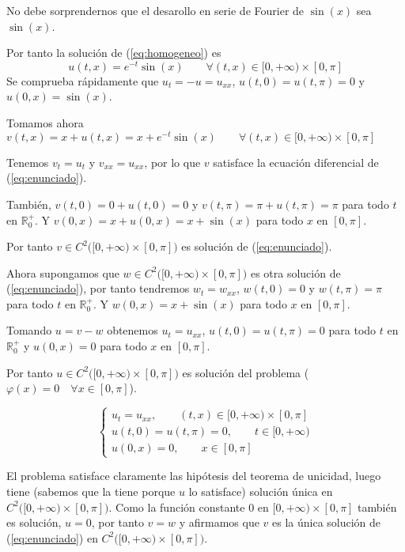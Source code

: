 \documentclass[a4]{article}
\begin{document}
No debe sorprendernos que el desarollo en serie de Fourier de
$\sin(x)$ sea $\sin(x)$.

Por tanto la solución de (\ref{eq:homogeneo}) es
\begin{equation} \label{eq:u}
  u(t,x)=e^{-t}\sin(x)\qquad\forall(t,x)\in[0,+\infty)\times [0,\pi]
\end{equation}
Se comprueba rápidamente que $u_t=-u=u_{xx}$, $u(t,0)=u(t,\pi)=0$ y
$u(0,x)=\sin(x)$.

\newpage

Tomamos ahora $v(t,x)=x+u(t,x)=x+e^{-t}\sin(x)\qquad\forall(t,x)\in[0,+\infty)\times [0,\pi]$

Tenemos $v_t=u_t$ y $v_{xx}=u_{xx}$, por lo que $v$ satisface la
ecuación diferencial de (\ref{eq:enunciado}).

También, $v(t,0)=0+u(t,0)=0$ y $v(t,\pi)=\pi+u(t,\pi)=\pi$ para todo
$t$ en $\mathbb{R}^+_0$. Y $v(0,x)=x+u(0,x)=x+\sin(x)$ para todo $x$ en
$[0,\pi]$.

Por tanto $v\in C^2\big([0,+\infty)\times[0,\pi]\big)$ es solución de (\ref{eq:enunciado}).

\vspace{4mm}

Ahora supongamos que $w\in C^2\big([0,+\infty)\times[0,\pi]\big)$ es
otra solución de (\ref{eq:enunciado}), por tanto tendremos
$w_t=w_{xx}$, $w(t,0)=0$ y $w(t,\pi)=\pi$ para todo $t$ en
$\mathbb{R}^+_0$. Y $w(0,x)=x+\sin(x)$ para todo $x$ en $[0,\pi]$.

Tomando $u=v-w$ obtenemos $u_t=u_{xx}$, $u(t,0)=u(t,\pi)=0$ para todo
$t$ en $\mathbb{R}^+_0$ y $u(0,x)=0$ para todo $x$ en $[0,\pi]$.

Por tanto $u\in C^2\big([0,+\infty)\times[0,\pi]\big)$ es solución del
problema ($\varphi(x)=0\quad\forall x\in[0,\pi]$).

\begin{equation} \label{eq:nulo}
  \begin{cases}
    u_t=u_{xx}, \qquad (t,x)\in [0,+\infty)\times [0,\pi] \\
    u(t,0)=u(t,\pi)=0, \qquad t\in [0,+\infty) \\
    u(0,x)=0, \qquad x\in [0,\pi]
  \end{cases}
\end{equation}

El problema satisface claramente las hipótesis del teorema de
unicidad, luego tiene (sabemos que la tiene porque $u$ lo satisface)
solución única en $C^2\big([0,+\infty)\times[0,\pi]\big)$. Como la
función constante 0 en $[0,+\infty)\times[0,\pi]$ también es solución,
$u=0$, por tanto $v=w$ y afirmamos que $v$ es la única solución de
(\ref{eq:enunciado}) en $C^2\big([0,+\infty)\times[0,\pi]\big)$.
\end{document}
